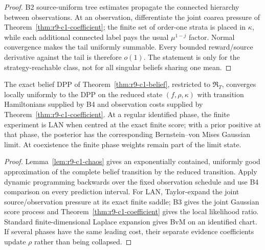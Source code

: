 \begin{proof}
B2 source-uniform tree estimates propagate the connected hierarchy between
observations.  At an observation, differentiate the joint coarea pressure of
Theorem~\ref{thm:r9-c1-coefficient}; the finite set of order-one strata is
placed in $\kappa$, while each additional connected label pays the usual
$\mu^{1-j}$ factor.  Normal convergence makes the tail uniformly summable.
Every bounded reward/source derivative against the tail is therefore $o(1)$.
The statement is only for the strategy-reachable class, not for all singular
beliefs sharing one mean.
\end{proof}

\begin{theorem}
\label{thm:r9-c1-main}
The exact belief DPP of Theorem~\ref{thm:r9-c1-belief}, restricted to
$\mathfrak R_T$, converges locally uniformly to the DPP on the reduced state
$(f,\rho,\kappa)$ with transition Hamiltonians supplied by B4 and observation
costs supplied by Theorem~\ref{thm:r9-c1-coefficient}.  At a regular identified
phase, the finite experiment is LAN when centred at the exact finite score;
with a prior positive at that phase, the posterior has the corresponding
Bernstein--von Mises Gaussian limit.  At coexistence the finite phase weights
remain part of the limit state.
\end{theorem}

\begin{proof}
Lemma~\ref{lem:r9-c1-chaos} gives an exponentially contained, uniformly good
approximation of the complete belief transition by the reduced transition.
Apply dynamic programming backwards over the fixed observation schedule and
use B4 comparison on every prediction interval.  For LAN, Taylor-expand the
joint source/observation pressure at its exact finite saddle; B3 gives the
joint Gaussian score process and Theorem~\ref{thm:r9-c1-coefficient} gives the
local likelihood ratio.  Standard finite-dimensional Laplace expansion gives
BvM on an identified chart.  If several phases have the same leading cost,
their separate evidence coefficients update $\rho$ rather than being
collapsed.
\end{proof}
